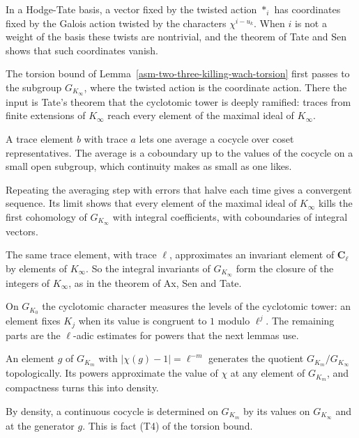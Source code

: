 In a Hodge-Tate basis, a vector fixed by the twisted action $*_i$ has
coordinates fixed by the Galois action twisted by the characters
$\chi^{i-u_k}$. When $i$ is not a weight of the basis these twists are
nontrivial, and the theorem of Tate and Sen shows that such coordinates vanish.

The torsion bound of Lemma~\ref{asm-two-three-killing-wach-torsion} first
passes to the subgroup $G_{K_\infty}$, where the twisted action is the
coordinate action. There the input is Tate's theorem that the cyclotomic tower
is deeply ramified: traces from finite extensions of $K_\infty$ reach every
element of the maximal ideal of $K_\infty$.

A trace element $b$ with trace $a$ lets one average a cocycle over coset
representatives. The average is a coboundary up to the values of the cocycle on
a small open subgroup, which continuity makes as small as one likes.

Repeating the averaging step with errors that halve each time gives a
convergent sequence. Its limit shows that every element of the maximal ideal of
$K_\infty$ kills the first cohomology of $G_{K_\infty}$ with integral
coefficients, with coboundaries of integral vectors.

The same trace element, with trace $\ell$, approximates an invariant element of
$\mathbf C_\ell$ by elements of $K_\infty$. So the integral invariants of
$G_{K_\infty}$ form the closure of the integers of $K_\infty$, as in the theorem
of Ax, Sen and Tate.

On $G_{K_0}$ the cyclotomic character measures the levels of the cyclotomic
tower: an element fixes $K_j$ when its value is congruent to $1$ modulo
$\ell^j$. The remaining parts are the $\ell$-adic estimates for powers that the
next lemmas use.

An element $g$ of $G_{K_m}$ with $|\chi(g)-1|=\ell^{-m}$ generates the quotient $G_{K_m}/G_{K_\infty}$ topologically. Its powers
approximate the value of $\chi$ at any element of $G_{K_m}$, and compactness
turns this into density.

By density, a continuous cocycle is determined on $G_{K_m}$ by its values on
$G_{K_\infty}$ and at the generator $g$. This is fact (T4) of the torsion bound.

